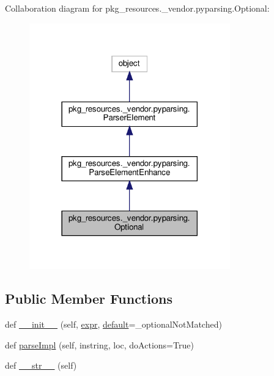 Collaboration diagram for pkg\+\_\+resources.\+\_\+vendor.\+pyparsing.\+Optional\+:
\nopagebreak
\begin{figure}[H]
\begin{center}
\leavevmode
\includegraphics[width=246pt]{classpkg__resources_1_1__vendor_1_1pyparsing_1_1Optional__coll__graph}
\end{center}
\end{figure}
\subsection*{Public Member Functions}
\begin{DoxyCompactItemize}
\item 
def \hyperlink{classpkg__resources_1_1__vendor_1_1pyparsing_1_1Optional_a961ba4ed7d732d2e1c2c4ff451a59828}{\+\_\+\+\_\+init\+\_\+\+\_\+} (self, \hyperlink{classpkg__resources_1_1__vendor_1_1pyparsing_1_1ParseElementEnhance_a34e02b3404b2a545ca1be8b522758896}{expr}, \hyperlink{namespacepkg__resources_1_1__vendor_1_1pyparsing_aa2abdf12745e973b2a2a5821f96cb4b1}{default}=\+\_\+optional\+Not\+Matched)
\item 
def \hyperlink{classpkg__resources_1_1__vendor_1_1pyparsing_1_1Optional_a29bcd35d3c4372bee814ce583f27b8d9}{parse\+Impl} (self, instring, loc, do\+Actions=True)
\item 
def \hyperlink{classpkg__resources_1_1__vendor_1_1pyparsing_1_1Optional_a5b76d791b02bd21e12274019877a26e5}{\+\_\+\+\_\+str\+\_\+\+\_\+} (self)
\end{DoxyCompactItemize}
